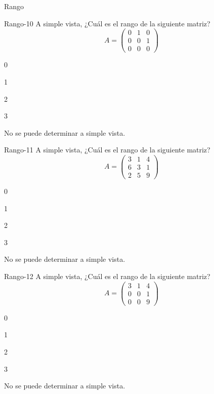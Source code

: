 \documentclass[a4,11pt]{aleph-notas}
\begin{document}
\begin{quiz}{Rango}
\begin{multi}[]%
    {Rango-10}
    A simple vista, ¿Cuál es el rango de la siguiente matriz?
    \[
        A=\begin{pmatrix} 0 & 1 & 0 \\ 0 & 0 & 1 \\ 0 & 0 & 0 \end{pmatrix}
    \]
    \item 0
    \item 1
    \item* 2
    \item 3
    \item No se puede determinar a simple vista.
\end{multi}

\begin{multi}[]%
    {Rango-11}
    A simple vista, ¿Cuál es el rango de la siguiente matriz?
    \[
        A=\begin{pmatrix} 3 & 1 & 4 \\ 6 & 3 & 1 \\ 2 & 5 & 9 \end{pmatrix}
    \]
    \item 0
    \item 1
    \item 2
    \item 3
    \item* No se puede determinar a simple vista.
\end{multi}

\begin{multi}[]%
    {Rango-12}
    A simple vista, ¿Cuál es el rango de la siguiente matriz?
    \[
        A=\begin{pmatrix} 3 & 1 & 4 \\ 0 & 0 & 1 \\ 0 & 0 & 9 \end{pmatrix}
    \]
    \item 0
    \item 1
    \item* 2
    \item 3
    \item No se puede determinar a simple vista.
\end{multi}


\end{quiz}
\end{document}
